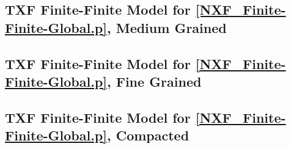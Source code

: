 \documentclass{easychair}
\begin{document}
\newpage
\subsection{TXF Finite-Finite Model for \ref{NXF_Finite-Finite-Global.p}, Medium Grained}
\label{NXF_Finite-Finite-Global_Medium.s}
\begin{small}

\end{small}

\newpage
\subsection{TXF Finite-Finite Model for \ref{NXF_Finite-Finite-Global.p}, Fine Grained}
\label{NXF_Finite-Finite-Global_Fine.s}
\begin{small}

\end{small}

\newpage
\subsection{TXF Finite-Finite Model for \ref{NXF_Finite-Finite-Global.p}, Compacted}
\label{NXF_Finite-Finite-Global_Compact.s}
\begin{small}

\end{small}

\end{document}

